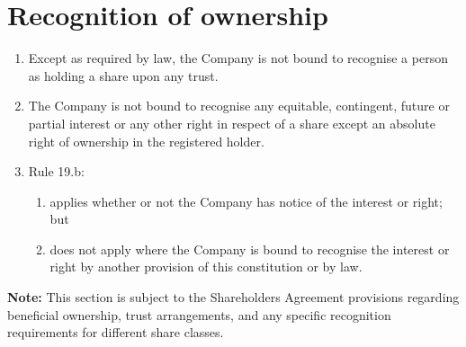\section{Recognition of ownership}

\begin{enumerate}[label=(\alph*)]
    \item Except as required by law, the Company is not bound to recognise a person as holding a share upon any trust.
    
    \item The Company is not bound to recognise any equitable, contingent, future or partial interest or any other right in respect of a share except an absolute right of ownership in the registered holder.
    
    \item Rule 19.b:
    \begin{enumerate}[label=(\roman*)]
        \item applies whether or not the Company has notice of the interest or right; but
        \item does not apply where the Company is bound to recognise the interest or right by another provision of this constitution or by law.
    \end{enumerate}
\end{enumerate}

\textbf{Note:} This section is subject to the Shareholders Agreement provisions regarding beneficial ownership, trust arrangements, and any specific recognition requirements for different share classes. 